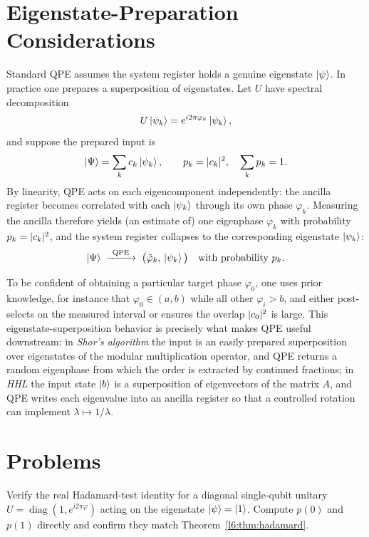 \section{Eigenstate-Preparation Considerations}

Standard QPE assumes the system register holds a genuine eigenstate
$\ket{\psi}$. In practice one prepares a superposition of eigenstates. Let $U$
have spectral decomposition
\[
  U\ket{\psi_{k}}=e^{i2\pi\varphi_{k}}\ket{\psi_{k}},
\]
and suppose the prepared input is
\[
  \ket{\Psi}=\sum_{k}c_{k}\ket{\psi_{k}},\qquad p_{k}=\lvert c_{k}\rvert^{2},
  \quad\sum_{k}p_{k}=1 .
\]
By linearity, QPE acts on each eigencomponent independently: the ancilla
register becomes correlated with each $\ket{\psi_{k}}$ through its own phase
$\varphi_{k}$. Measuring the ancilla therefore yields (an estimate of) one
eigenphase $\varphi_{k}$ with probability $p_{k}=\lvert c_{k}\rvert^{2}$, and the
system register collapses to the corresponding eigenstate $\ket{\psi_{k}}$:
\[
  \ket{\Psi}\;\xrightarrow{\ \mathrm{QPE}\ }\;
  \big(\tilde\varphi_{k},\,\ket{\psi_{k}}\big)\quad\text{with probability } p_{k}.
\]

\begin{remark}
To be confident of obtaining a particular target phase $\varphi_{0}$, one uses
prior knowledge, for instance that $\varphi_{0}\in(a,b)$ while all other
$\varphi_{i}>b$, and either post-selects on the measured interval or ensures the
overlap $\lvert c_{0}\rvert^{2}$ is large. This eigenstate-superposition behavior is
precisely what makes QPE useful downstream: in \emph{Shor's algorithm} the
input is an easily prepared superposition over eigenstates of the modular
multiplication operator, and QPE returns a random eigenphase from which the
order is extracted by continued fractions; in \emph{HHL} the input state
$\ket{b}$ is a superposition of eigenvectors of the matrix $A$, and QPE writes
each eigenvalue into an ancilla register so that a controlled rotation can
implement $\lambda\mapsto 1/\lambda$.
\end{remark}

\section{Problems}

\begin{exercise}
Verify the real Hadamard-test identity for a diagonal single-qubit unitary
$U=\operatorname{diag}(1,e^{i2\pi\varphi})$ acting on the eigenstate
$\ket{\psi}=\ket{1}$. Compute $p(0)$ and $p(1)$ directly and confirm they match
Theorem~\ref{l6:thm:hadamard}.
\end{exercise}

